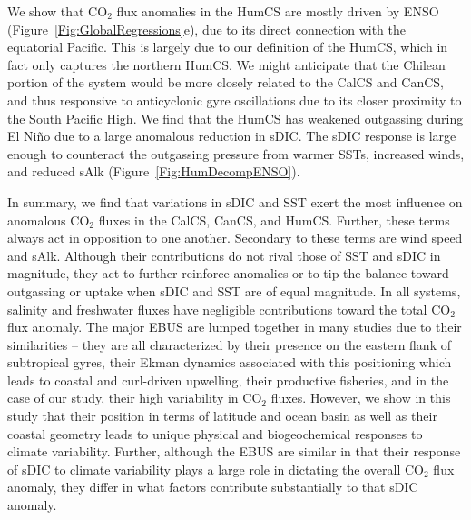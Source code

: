 \documentclass[hvmath, online,bgd]{copernicus_discussions}
\begin{document}
We show that CO$_{2}$ flux anomalies in the HumCS are mostly driven by ENSO (Figure~\ref{Fig:GlobalRegressions}e), due to its direct connection with the equatorial Pacific. This is largely due to our definition of the HumCS, which in fact only captures the northern HumCS. We might anticipate that the Chilean portion of the system would be more closely related to the CalCS and CanCS, and thus responsive to anticyclonic gyre oscillations due to its closer proximity to the South Pacific High. We find that the HumCS has weakened outgassing during El Ni\~no due to a large anomalous reduction in sDIC. The sDIC response is large enough to counteract the outgassing pressure from warmer SSTs, increased winds, and reduced sAlk (Figure~\ref{Fig:HumDecompENSO}). 

In summary, we find that variations in sDIC and SST exert the most influence on anomalous CO$_{2}$ fluxes in the CalCS, CanCS, and HumCS. Further, these terms always act in opposition to one another. Secondary to these terms are wind speed and sAlk. Although their contributions do not rival those of SST and sDIC in magnitude, they act to further reinforce anomalies or to tip the balance toward outgassing or uptake when sDIC and SST are of equal magnitude. In all systems, salinity and freshwater fluxes have negligible contributions toward the total CO$_{2}$ flux anomaly. The major EBUS are lumped together in many studies due to their similarities -- they are all characterized by their presence on the eastern flank of subtropical gyres, their Ekman dynamics associated with this positioning which leads to coastal and curl-driven upwelling, their productive fisheries, and in the case of our study, their high variability in CO$_{2}$ fluxes. However, we show in this study that their position in terms of latitude and ocean basin as well as their coastal geometry leads to unique physical and biogeochemical responses to climate variability. Further, although the EBUS are similar in that their response of sDIC to climate variability plays a large role in dictating the overall CO$_{2}$ flux anomaly, they differ in what factors contribute substantially to that sDIC anomaly. 
\end{document}
